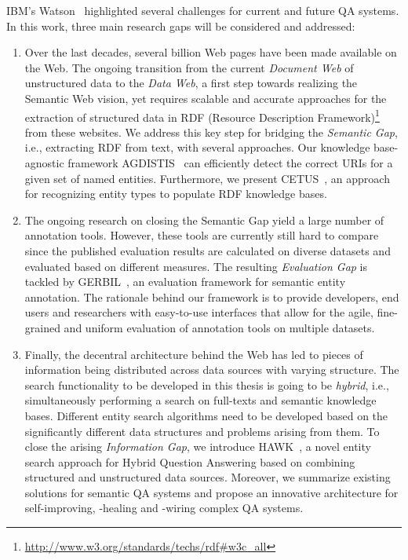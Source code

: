 IBM's Watson~\cite{watson} highlighted several challenges for current and future QA systems.
In this work, three main research gaps will be considered and addressed:
\begin{enumerate}
\item 
Over the last decades, several billion Web pages have been made available on the Web. 
The ongoing transition from the current \emph{Document Web} of unstructured data to the \emph{Data Web}, a first step towards realizing the Semantic Web vision, yet requires scalable and accurate approaches for the extraction of structured data in RDF (Resource Description Framework)\footnote{\url{http://www.w3.org/standards/techs/rdf\#w3c_all}} from these websites.
We address this key step for bridging the \emph{Semantic Gap}, i.e., extracting RDF from text,  with several approaches.
Our knowledge base-agnostic framework AGDISTIS~\cite{agdistis_iswc} can efficiently detect the correct URIs for a given set of named entities.
Furthermore, we present CETUS~\cite{CETUS_2015}, an approach for recognizing entity types to populate RDF knowledge bases. 
\item 
The ongoing research on closing the Semantic Gap yield a large number of annotation tools.
However, these tools are currently still hard to compare since the published evaluation results are calculated on diverse datasets and evaluated based on different measures.
The resulting \emph{Evaluation Gap} is tackled by GERBIL~\cite{GERBIL}, an evaluation framework for semantic entity annotation. The rationale behind our framework is to provide developers, end users and researchers with easy-to-use interfaces that allow for the agile, fine-grained and uniform evaluation of annotation tools on multiple datasets.
\item 
Finally, the decentral architecture behind the Web has led to pieces of information being distributed across data sources with varying structure. 
The search functionality to be developed in this thesis is going to be \emph{hybrid}, i.e., simultaneously performing a search on full-texts and semantic knowledge bases.
Different entity search algorithms need to be developed based on the significantly different data structures and problems arising from them. 
To close the arising \emph{Information Gap}, we introduce HAWK~\cite{hawk_2015}, a novel entity search approach for Hybrid Question Answering based on combining structured and unstructured data sources.
Moreover, we summarize existing solutions for semantic QA systems and propose an innovative architecture for self-improving, -healing and -wiring complex QA systems.
\end{enumerate}

